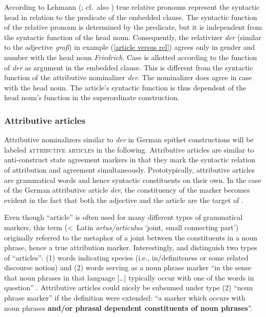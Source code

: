 According to Lehmann (\citeyear[230–231]{lehmann1984}; cf.~also \citealt[181]{himmelmann1997}) true relative pronouns represent the syntactic head in relation to the predicate of the embedded clause. The syntactic function of the relative pronoun is determined by the predicate, but it is independent from the syntactic function of the head noun. Consequently, the relativizer \textit{der} (similar to the adjective \textit{groß}) in example (\ref{article versus rel}) agrees only in gender and number with the head noun \textit{Friedrich}. Case is allotted according to the function of \textit{der} as argument in the embedded clause. This is different from the syntactic function of the attributive nominalizer \textit{der}. The nominalizer does agree in case with the head noun. The article's syntactic function is thus dependent of the head noun's function in the superordinate construction.

\subsubsection{Attributive articles}
\label{attr art}
Attributive nominalizers similar to \textit{der} in German epithet constructions will be labeled \textsc{attributive articles} in the following. Attributive articles are similar to anti\hyp{}construct state agreement markers in that they mark the syntactic relation of attribution and agreement simultaneously. Prototypically, attributive articles are grammatical words and hence syntactic constituents on their own. In the case of the German attributive article \textit{der}, the constituency of the marker becomes evident in the fact that both the adjective and the article are the target of .

Even though “article” is often used for many different types of grammatical markers, this term (<~Latin \textit{artus\slash{}articulus} ‘joint, small connecting part’) originally referred to the metaphor of a joint between the constituents in a noun phrase, hence a true attribution marker. Interestingly, \citet[83]{dryer1989a} and \citet{rijkhoff2002} distinguish two types of “articles”: (1) words indicating species (i.e., in\slash{}definiteness or some related discourse notion) and (2) words serving as a noun phrase marker “in the sense that noun phrases in that language [\dots] typically occur with one of the words in question” \citep[285]{rijkhoff2002}. Attributive articles could nicely be subsumed under type (2) “noun phrase marker” if the definition were extended: “a marker which occurs with noun phrases \textbf{and\slash{}or phrasal dependent constituents of noun phrases}”.

